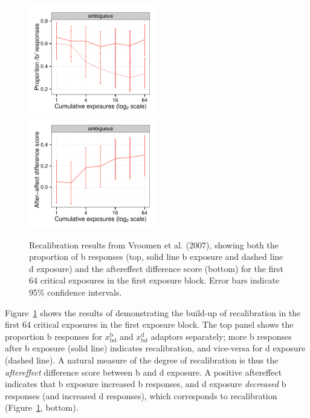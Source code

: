 \begin{figure}[!htb]
  \centering
  \includegraphics[width=0.5\textwidth]{vroomen-bd-recal-first-64.pdf}
  \includegraphics[width=0.5\textwidth]{vroomen-ae-recal-first-64.pdf}
  \caption{Recalibration results from Vroomen et al. (2007), showing both the proportion of \ph b responses (top, solid line \ph b exposure and dashed line \ph d exposure) and the aftereffect difference score (bottom) for the first 64 critical exposures in the first exposure block. Error bars indicate 95\% confidence intervals.}
  \label{fig:vroomen-results-64-recal}
\end{figure}

Figure~\ref{fig:vroomen-results-64-recal} shows the results of \textcite{Vroomen2007} demonstrating the build-up of recalibration in the first 64 critical exposures in the first exposure block.  The top panel shows the proportion \ph b responses for $x_\mathrm{bd}^\mathrm{b}$ and $x_\mathrm{bd}^\mathrm{d}$ adaptors separately; more \ph b responses after \ph b exposure (solid line) indicates recalibration, and vice-versa for \ph d exposure (dashed line).  A natural measure of the degree of recalibration is thus the \emph{aftereffect} difference score between \ph b and \ph d exposure.  A positive aftereffect indicates that \ph b exposure increased \ph b responses, and \ph d exposure \emph{decreased} \ph b responses (and increased \ph d responses), which corresponds to recalibration (Figure~\ref{fig:vroomen-results-64-recal}, bottom).

